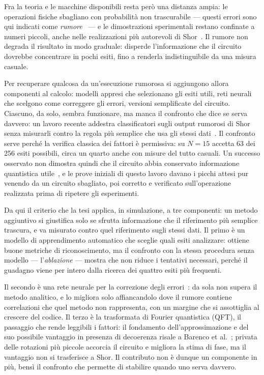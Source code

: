 Fra la teoria e le macchine disponibili resta però una distanza ampia: le
operazioni fisiche sbagliano con probabilità non trascurabile --- questi errori
sono qui indicati come \emph{rumore}~\cite{preskill2018} --- e le dimostrazioni
sperimentali restano confinate a numeri piccoli, anche nelle realizzazioni più
autorevoli di Shor~\cite{vandersypen2001,monz2016,skosana2021}.
Il rumore non degrada il risultato in modo graduale: disperde l'informazione che
il circuito dovrebbe concentrare in pochi esiti, fino a renderla indistinguibile
da una misura casuale.

Per recuperare qualcosa da un'esecuzione rumorosa si aggiungono allora componenti
al calcolo: modelli appresi che selezionano gli esiti utili, reti neurali che
scelgono come correggere gli errori, versioni semplificate del circuito.
Ciascuno, da solo, sembra funzionare, ma manca il confronto che dice se serva
davvero: un lavoro recente addestra classificatori sugli output rumorosi di Shor
senza misurarli contro la regola più semplice che usa gli stessi
dati~\cite{yang2026}.
Il confronto serve perché la verifica classica dei fattori è permissiva: su
$N=15$ accetta 63 dei 256 esiti possibili, circa un quarto anche con misure del
tutto casuali.
Un successo osservato non dimostra quindi che il circuito abbia conservato
informazione quantistica utile~\cite{smolin2013}, e le prove iniziali di questo lavoro davano i
picchi attesi pur venendo da un circuito sbagliato, poi corretto e verificato
sull'operazione realizzata prima di ripetere gli esperimenti.

Da qui il criterio che la tesi applica, in simulazione, a tre componenti: un
metodo aggiuntivo si giustifica solo se sfrutta informazione che il riferimento
più semplice trascura, e va misurato contro quel riferimento sugli stessi dati.
Il primo è un modello di apprendimento automatico che sceglie quali esiti
analizzare: ottiene buone metriche di riconoscimento, ma il confronto con la
stessa procedura senza modello --- l'\emph{ablazione} --- mostra che non riduce i
tentativi necessari, perché il guadagno viene per intero dalla ricerca dei
quattro esiti più frequenti.

Il secondo è una rete neurale per la correzione degli errori~\cite{alphaqubit2024}:
da sola non supera
il metodo analitico, e lo migliora solo affiancandolo dove il rumore contiene
correlazioni che quel metodo non rappresenta, con un margine che si assottiglia
al crescere del codice.
Il terzo è la trasformata di Fourier quantistica (QFT), il passaggio che rende
leggibili i fattori: il fondamento dell'approssimazione e del suo possibile
vantaggio in presenza di decoerenza risale a Barenco et
al.~\cite{barencoAQFT1996}; privata delle rotazioni più piccole accorcia il circuito e
migliora la stima di fase, ma il vantaggio non si trasferisce a Shor.
Il contributo non è dunque un componente in più, bensì il confronto che permette
di stabilire quando uno serva davvero.

